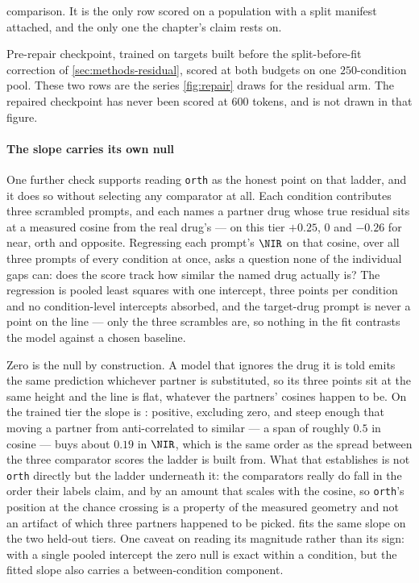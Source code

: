 \begin{table}[htbp]
\begin{fullwidth}
\begin{threeparttable}
\begin{tablenotes}[flushleft]
  comparison. It is the only row scored on a population with a split manifest
  attached, and the only one the chapter's claim rests on.
  \item[b] Pre-repair checkpoint, trained on targets built before the
  split-before-fit correction of \cref{sec:methods-residual}, scored at both
  budgets on one $\num{250}$-condition pool. These two rows are the series
  \cref{fig:repair} draws for the residual arm. The repaired checkpoint has never
  been scored at $600$ tokens, and is not drawn in that figure.
  \end{tablenotes}
  \end{threeparttable}
  \end{fullwidth}
  \end{table}

  \paragraph{The slope carries its own null}
  One further check supports reading \texttt{orth} as the honest point on that
ladder, and it does so without selecting any comparator at all. Each condition
contributes three scrambled prompts, and each names a partner drug whose true
residual sits at a measured cosine from the real drug's --- on this tier
$+0.25$, $0$ and $-0.26$ for near, orth and opposite.  Regressing each prompt's $\NIR$ on
that cosine, over all three prompts of every condition at once, asks a question
none of the individual gaps can: does the score track how similar the named drug
actually is? The regression is pooled least squares with one intercept, three
points per condition and no condition-level intercepts absorbed, and the
target-drug prompt is never a point on the line --- only the three scrambles
are, so nothing in the fit contrasts the model against a chosen baseline.

Zero is the null by construction. A model that ignores the drug it is told
emits the same prediction whichever partner is substituted, so its three points
sit at the same height and the line is flat, whatever the partners' cosines
happen to be. On the trained tier the slope is :
positive, excluding zero, and steep enough that moving a partner from
anti-correlated to similar --- a span of roughly $0.5$ in cosine --- buys about
$0.19$ in $\NIR$, which is the same order as the spread between the three
comparator scores the ladder is built from. What that establishes is not
\texttt{orth} directly but the ladder underneath it: the comparators really do
fall in the order their labels claim, and by an amount that scales with the
cosine, so \texttt{orth}'s position at the chance crossing is a property of the
measured geometry and not an artifact of which three partners happened to be
picked.  fits the same slope on the two held-out
tiers. One caveat on reading its magnitude rather than its sign: with a single
pooled intercept the zero null is exact within a condition, but the fitted slope
also carries a between-condition component.


